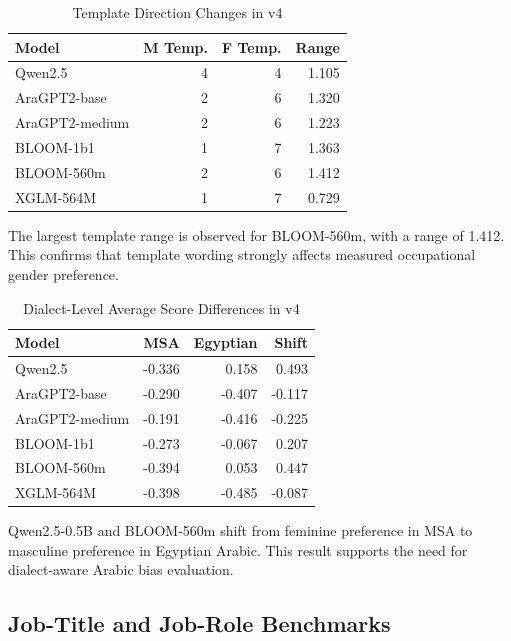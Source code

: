 \documentclass[conference]{IEEEtran}
\begin{document}
\begin{table}[htbp]
\caption{Template Direction Changes in v4}
\begin{center}
\begin{tabular}{lrrr}
\toprule
Model & M Temp. & F Temp. & Range \\
\midrule
Qwen2.5 & 4 & 4 & 1.105 \\
AraGPT2-base & 2 & 6 & 1.320 \\
AraGPT2-medium & 2 & 6 & 1.223 \\
BLOOM-1b1 & 1 & 7 & 1.363 \\
BLOOM-560m & 2 & 6 & 1.412 \\
XGLM-564M & 1 & 7 & 0.729 \\
\bottomrule
\end{tabular}
\label{tab:template}
\end{center}
\end{table}

The largest template range is observed for BLOOM-560m, with a range of 1.412. This confirms that template wording strongly affects measured occupational gender preference.

\begin{table}[htbp]
\caption{Dialect-Level Average Score Differences in v4}
\begin{center}
\begin{tabular}{lrrr}
\toprule
Model & MSA & Egyptian & Shift \\
\midrule
Qwen2.5 & -0.336 & 0.158 & 0.493 \\
AraGPT2-base & -0.290 & -0.407 & -0.117 \\
AraGPT2-medium & -0.191 & -0.416 & -0.225 \\
BLOOM-1b1 & -0.273 & -0.067 & 0.207 \\
BLOOM-560m & -0.394 & 0.053 & 0.447 \\
XGLM-564M & -0.398 & -0.485 & -0.087 \\
\bottomrule
\end{tabular}
\label{tab:dialect}
\end{center}
\end{table}

Qwen2.5-0.5B and BLOOM-560m shift from feminine preference in MSA to masculine preference in Egyptian Arabic. This result supports the need for dialect-aware Arabic bias evaluation.

\subsection{Job-Title and Job-Role Benchmarks}
\end{document}
